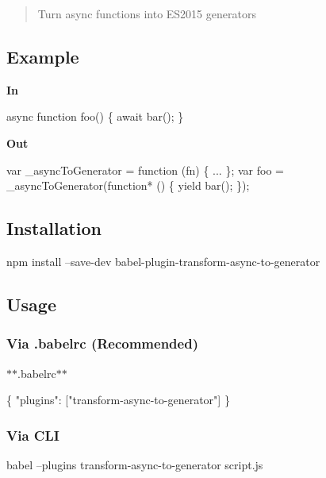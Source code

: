 \begin{quote}
Turn async functions into E\+S2015 generators \end{quote}


\subsection*{Example}

{\bfseries In}


\begin{DoxyCode}
async function foo() \{
  await bar();
\}
\end{DoxyCode}


{\bfseries Out}


\begin{DoxyCode}
var \_asyncToGenerator = function (fn) \{
  ...
\};
var foo = \_asyncToGenerator(function* () \{
  yield bar();
\});
\end{DoxyCode}


\subsection*{Installation}


\begin{DoxyCode}
npm install --save-dev babel-plugin-transform-async-to-generator
\end{DoxyCode}


\subsection*{Usage}

\subsubsection*{Via {\ttfamily .babelrc} (Recommended)}

$\ast$$\ast$.babelrc$\ast$$\ast$


\begin{DoxyCode}
\{
  "plugins": ["transform-async-to-generator"]
\}
\end{DoxyCode}


\subsubsection*{Via C\+LI}


\begin{DoxyCode}
babel --plugins transform-async-to-generator script.js
\end{DoxyCode}


